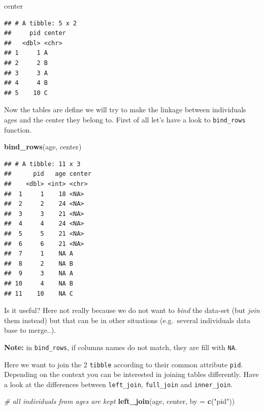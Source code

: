 \documentclass[
]{book}
\newenvironment{Shaded}{\begin{snugshade}}{\end{snugshade}}
\newcommand{\AttributeTok}[1]{\textcolor[rgb]{0.13,0.29,0.53}{#1}}
\newcommand{\CommentTok}[1]{\textcolor[rgb]{0.56,0.35,0.01}{\textit{#1}}}
\newcommand{\FunctionTok}[1]{\textcolor[rgb]{0.13,0.29,0.53}{\textbf{#1}}}
\newcommand{\NormalTok}[1]{#1}
\newcommand{\StringTok}[1]{\textcolor[rgb]{0.31,0.60,0.02}{#1}}
\begin{document}
\begin{Shaded}
\begin{Highlighting}[]
\NormalTok{center}
\end{Highlighting}
\end{Shaded}

\begin{verbatim}
## # A tibble: 5 x 2
##     pid center
##   <dbl> <chr> 
## 1     1 A     
## 2     2 B     
## 3     3 A     
## 4     4 B     
## 5    10 C
\end{verbatim}

Now the tables are define we will try to make the linkage between individuals ages and the center
they belong to.
First of all let's have a look to \texttt{bind\_rows} function.

\begin{Shaded}
\begin{Highlighting}[]
\FunctionTok{bind\_rows}\NormalTok{(age, center)}
\end{Highlighting}
\end{Shaded}

\begin{verbatim}
## # A tibble: 11 x 3
##      pid   age center
##    <dbl> <int> <chr> 
##  1     1    18 <NA>  
##  2     2    24 <NA>  
##  3     3    21 <NA>  
##  4     4    24 <NA>  
##  5     5    21 <NA>  
##  6     6    21 <NA>  
##  7     1    NA A     
##  8     2    NA B     
##  9     3    NA A     
## 10     4    NA B     
## 11    10    NA C
\end{verbatim}

Is it useful?
Here not really because we do not want to \emph{bind} the data-set (but \emph{join} them instead) but that can be in other situations (e.g.~several individuals data base to merge..).

\textbf{Note:} in \texttt{bind\_rows}, if columns names do not match, they are fill with \texttt{NA}.

Here we want to join the 2 \texttt{tibble} according to their common attribute \texttt{pid}. Depending
on the context you can be interested in joining tables differently. Have a look at the differences
between \texttt{left\_join}, \texttt{full\_join} and \texttt{inner\_join}.

\begin{Shaded}
\begin{Highlighting}[]
\CommentTok{\# all individuals from ages are kept}
\FunctionTok{left\_join}\NormalTok{(age, center, }\AttributeTok{by =} \FunctionTok{c}\NormalTok{(}\StringTok{"pid"}\NormalTok{))}
\end{Highlighting}
\end{Shaded}
\end{document}
